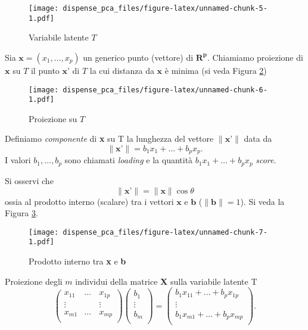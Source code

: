 \documentclass[
  11pt,
]{book}
\begin{document}
\begin{figure}
\centering
\texttt{[image: dispense\_pca\_files/figure-latex/unnamed-chunk-5-1.pdf]}
\caption{\label{fig:unnamed-chunk-5}Variabile latente \(T\)\label{fig:versore}}
\end{figure}

Sia \(\textbf{x}=(x_1,\dots,x_p)\) un generico punto (vettore) di \(\mathbf{R^p}\).
Chiamiamo proiezione di \(\textbf{x}\) su \(T\) il punto \(\textbf{x'}\) di \(T\) la
cui distanza da \(\textbf{x}\) è minima (si veda Figura \ref{fig:proiezione})

\begin{figure}
\centering
\texttt{[image: dispense\_pca\_files/figure-latex/unnamed-chunk-6-1.pdf]}
\caption{\label{fig:unnamed-chunk-6}Proiezione su \(T\)\label{fig:proiezione}}
\end{figure}

Definiamo \emph{componente} di \textbf{x} su T la lunghezza del vettore \(\|\textbf{x'} \|\) data da
\begin{equation}
\|\textbf{x'}\|=b_1x_1+\dots+b_px_p.
\end{equation}
I valori \(b_1,\dots,b_p\) sono chiamati \emph{loading} e la quantità
\(b_1x_1+\dots+b_px_p\) \emph{score}.

Si osservi che
\begin{equation}
\| \textbf{x'} \|=\|\textbf{x} \|\cos \theta
\end{equation}
ossia al prodotto interno (scalare) tra i vettori \(\textbf{x}\) e \(\textbf{b}\) (\(\| \textbf{b}\|=1\)).
Si veda la Figura \ref{fig:prodinterno}.

\begin{figure}
\centering
\texttt{[image: dispense\_pca\_files/figure-latex/unnamed-chunk-7-1.pdf]}
\caption{\label{fig:unnamed-chunk-7}Prodotto interno tra \textbf{x} e \textbf{b} \label{fig:prodinterno}}
\end{figure}

Proiezione degli \(m\) individui della matrice \textbf{X} sulla variabile latente T
\begin{equation}
\left(
\begin{array}{cccc}
x_{11}  & \dots & x_{1p} \\
\vdots & \quad & \vdots \\
x_{m1} & \dots & x_{mp} \\
\end{array}
\right)
\left(
\begin{array}{c}
b_1 \\
\vdots \\
b_m \\
\end{array}
\right)
=
\left(
\begin{array}{cccc}
b_1x_{11}  + \dots +b_p x_{1p} \\
\vdots   \\
b_1x_{m1} + \dots + b_px_{mp} \\
\end{array}
\right).
\end{equation}
\end{document}
